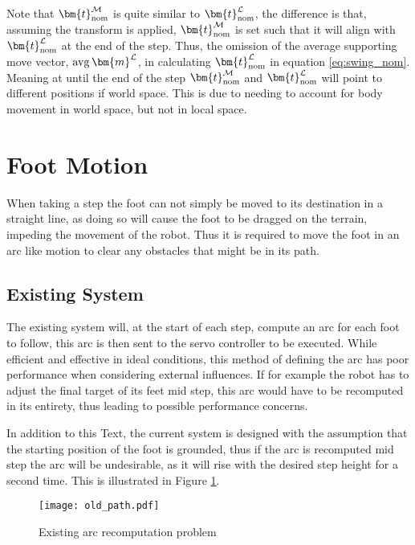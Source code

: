     Note that \(\bm{t}_\text{nom}\inrefframe{M}\) is quite similar to \(\bm{t}_\text{nom}\inrefframe{L}\), the difference is that, 
    assuming the  transform is applied, \(\bm{t}_\text{nom}\inrefframe{M}\) is set such that it
    will align with \(\bm{t}_\text{nom}\inrefframe{L}\)
    at the end of the step. Thus, the omission of the average supporting move vector, \(\avg \bm{m}\inrefframe{L}\), in calculating \(\bm{t}_\text{nom}\inrefframe{L}\)
    in equation \ref{eq:swing_nom}.
    Meaning at until the end of the step \(\bm{t}_\text{nom}\inrefframe{M}\) and \(\bm{t}_\text{nom}\inrefframe{L}\) will point 
    to different positions if world space. This is due to needing to account for body movement in world space, but not in local space.


    \section{Foot Motion} \label{sec:arc_generation}
    When taking a step the foot can not simply be moved to its destination in a straight line, as doing so will cause the foot to be dragged on the terrain,
    impeding the movement of the robot. Thus it is required to move the foot in an arc like motion to clear any obstacles that might be in its path.


    \subsection{Existing System}
        The existing system will, at the start of each step, compute an arc for each foot to follow, this arc is then sent to the servo controller
        to be executed. While efficient and effective in ideal conditions, this method of defining the arc has poor performance when considering external
        influences. If for example the robot has to adjust the final target of its feet mid step, this arc would have to be recomputed in its entirety,
        thus leading to possible performance concerns.

        In addition to this Text, the current system is designed with the assumption that the starting position of the foot is grounded, thus if the arc is recomputed
        mid step the arc will be undesirable, as it will rise with the desired step height for a second time. This is illustrated in Figure \ref{fig:old_arc}.

        \begin{figure}[h]
            \centering
            \hspace{-1.38cm}
            \texttt{[image: old\_path.pdf]}
            \caption{Existing arc recomputation problem}
            \label{fig:old_arc}
        \end{figure}

